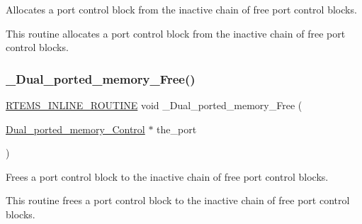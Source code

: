 Allocates a port control block from the inactive chain of free port control blocks. 

This routine allocates a port control block from the inactive chain of free port control blocks. \mbox{\label{group__ClassicDPMEMImpl_ga66c62de25dd210c71cfdf3658738c930}} 
\subsubsection{\texorpdfstring{\_Dual\_ported\_memory\_Free()}{\_Dual\_ported\_memory\_Free()}}
{\footnotesize\ttfamily \mbox{\hyperlink{group__RTEMSScoreBaseDefs_gac216239df231d5dbd15e3520b0b9313f}{R\+T\+E\+M\+S\+\_\+\+I\+N\+L\+I\+N\+E\+\_\+\+R\+O\+U\+T\+I\+NE}} void \+\_\+\+Dual\+\_\+ported\+\_\+memory\+\_\+\+Free (\begin{DoxyParamCaption}\item[{\mbox{\hyperlink{structDual__ported__memory__Control}{Dual\+\_\+ported\+\_\+memory\+\_\+\+Control}} $\ast$}]{the\+\_\+port }\end{DoxyParamCaption})}



Frees a port control block to the inactive chain of free port control blocks. 

This routine frees a port control block to the inactive chain of free port control blocks. 
